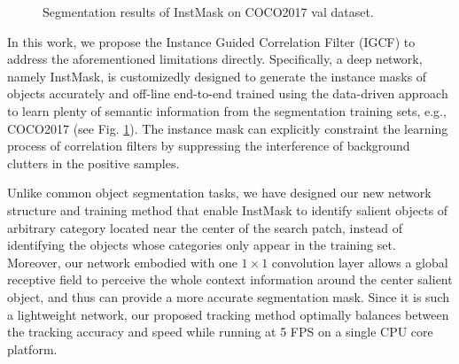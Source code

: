 \documentclass[review]{elsarticle}
\begin{document}
\begin{CJK*}{UTF8}{gbsn}
\begin{figure}
                       \hspace{-0.6em}
                       \hspace{-0.6em}
    \caption{Segmentation results of InstMask on COCO2017 \cite{Lin2014MicrosoftCC} val dataset.}
    \label{fig:InstMask}
\end{figure}

In this work, we propose the Instance Guided Correlation Filter (IGCF) to address the aforementioned limitations directly. Specifically, a deep network, namely InstMask, is customizedly designed to generate the instance masks of objects accurately and off-line end-to-end trained using the data-driven approach to learn plenty of semantic information from the segmentation training sets, e.g., COCO2017\cite{Lin2014MicrosoftCC} (see Fig. \ref{fig:InstMask}). The instance mask can explicitly constraint the learning process of correlation filters by suppressing the interference of background clutters in the positive samples. 

Unlike common object segmentation tasks, we have designed our new network structure and training method that enable InstMask to identify salient objects of arbitrary category located near the center of the search patch, instead of identifying the objects whose categories only appear in the training set. Moreover, our network embodied with one $1 \times 1$ convolution layer allows a global receptive field to perceive the whole context information around the center salient object, and thus can provide a more accurate segmentation mask. Since it is such a lightweight network, our proposed tracking method optimally balances between the tracking accuracy and speed while running at 5 FPS on a single CPU core platform. 


\end{CJK*}
\end{document}
